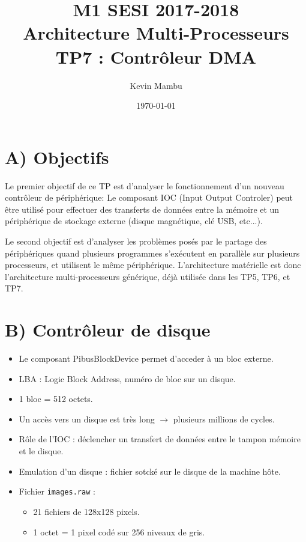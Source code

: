 \documentclass[10pt]{article}
\author{Kevin Mambu}
\date{\today}
\title{M1 SESI 2017-2018\\Architecture Multi-Processeurs\\TP7 : Contrôleur DMA}
\begin{document}
\maketitle

\section{A) Objectifs}
Le premier objectif de ce TP est d’analyser le fonctionnement d'un nouveau
contrôleur de périphérique: Le composant IOC (Input Output Controler) peut être
utilisé pour effectuer des transferts de données entre la mémoire et un
périphérique de stockage externe (disque magnétique, clé USB, etc...).

Le second objectif est d'analyser les problèmes posés par le partage des
périphériques quand plusieurs programmes s'exécutent en parallèle sur plusieurs
processeurs, et utilisent le même périphérique. L'architecture matérielle est
donc l'architecture multi-processeurs générique, déjà utilisée dans les TP5,
TP6, et TP7.

\section{B) Contrôleur de disque}
\begin{itemize}
  \item Le composant PibusBlockDevice permet d'acceder à un bloc externe.
  \item LBA : Logic Block Address, numéro de bloc sur un disque.
  \item 1 bloc = 512 octets.
  \item Un accès vers un disque est très long $\rightarrow$ plusieurs millions
  de cycles.
  \item Rôle de l'IOC : déclencher un transfert de données entre le tampon
  mémoire et le disque.
  \item Emulation d'un disque : fichier sotcké sur le disque de la machine hôte.
  \item Fichier \texttt{images.raw} :
  \begin{itemize}
    \item 21 fichiers de 128x128 pixels.
    \item 1 octet = 1 pixel codé sur 256 niveaux de gris.
  \end{itemize}
\end{itemize}
\end{document}
